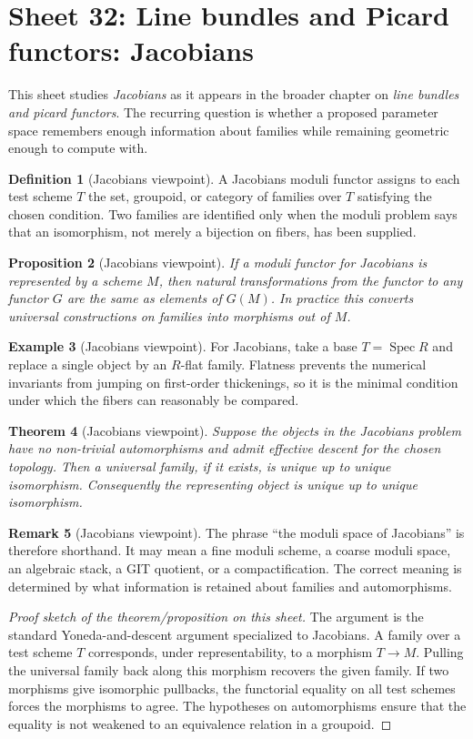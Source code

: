 \documentclass[11pt]{amsart}
\newtheorem{theorem}{Theorem}[section]
\newtheorem{proposition}[theorem]{Proposition}
\theoremstyle{definition}
\newtheorem{definition}[theorem]{Definition}
\newtheorem{example}[theorem]{Example}
\newtheorem{remark}[theorem]{Remark}
\newcommand{\Spec}{\operatorname{Spec}}
\begin{document}
\section{Sheet 32: Line bundles and Picard functors: Jacobians}
This sheet studies \emph{Jacobians} as it appears in the broader chapter on \emph{line bundles and picard functors}.  The recurring question is whether a proposed parameter space remembers enough information about families while remaining geometric enough to compute with.
\begin{definition}[Jacobians viewpoint]
A Jacobians moduli functor assigns to each test scheme $T$ the set, groupoid, or category of families over $T$ satisfying the chosen condition.  Two families are identified only when the moduli problem says that an isomorphism, not merely a bijection on fibers, has been supplied.
\end{definition}
\begin{proposition}[Jacobians viewpoint]
If a moduli functor for Jacobians is represented by a scheme $M$, then natural transformations from the functor to any functor $G$ are the same as elements of $G(M)$.  In practice this converts universal constructions on families into morphisms out of $M$.
\end{proposition}
\begin{example}[Jacobians viewpoint]
For Jacobians, take a base $T=\Spec R$ and replace a single object by an $R$-flat family.  Flatness prevents the numerical invariants from jumping on first-order thickenings, so it is the minimal condition under which the fibers can reasonably be compared.
\end{example}
\begin{theorem}[Jacobians viewpoint]
Suppose the objects in the Jacobians problem have no non-trivial automorphisms and admit effective descent for the chosen topology.  Then a universal family, if it exists, is unique up to unique isomorphism.  Consequently the representing object is unique up to unique isomorphism.
\end{theorem}
\begin{remark}[Jacobians viewpoint]
The phrase ``the moduli space of Jacobians'' is therefore shorthand.  It may mean a fine moduli scheme, a coarse moduli space, an algebraic stack, a GIT quotient, or a compactification.  The correct meaning is determined by what information is retained about families and automorphisms.
\end{remark}
\begin{proof}[Proof sketch of the theorem/proposition on this sheet]
The argument is the standard Yoneda-and-descent argument specialized to Jacobians.  A family over a test scheme $T$ corresponds, under representability, to a morphism $T\to M$.  Pulling the universal family back along this morphism recovers the given family.  If two morphisms give isomorphic pullbacks, the functorial equality on all test schemes forces the morphisms to agree.  The hypotheses on automorphisms ensure that the equality is not weakened to an equivalence relation in a groupoid.
\end{proof}
\end{document}
